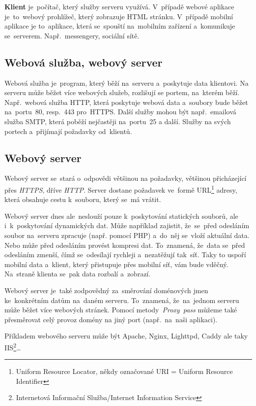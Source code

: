 \documentclass[14pt,a4paper]{article}
\begin{document}
        \textbf{Klient} je~počítač, který služby serveru využívá. V~případě webové aplikace je~to~webový prohlížeč, který zobrazuje HTML stránku.
        V~případě mobilní aplikace je to~aplikace, která se~spouští na~mobilním zařízení a~komunikuje se~serverem. Např.~messengery, sociální sítě.

        \subsection{Webová služba, webový server}
        Webová služba je~program, který běží na~serveru a~poskytuje data klientovi. Na serveru může běžet více webových služeb,
        rozlišují se portem, na~kterém běží. Např.~webová služba HTTP, která poskytuje webová data a~soubory bude běžet na~portu~80,
        resp.~443 pro~HTTPS. Další služby mohou být např.~emailová služba SMTP, která poběží nejčastěji na~portu~25 a další.
        Služby  na svých portech a~přijímají požadavky od~klientů.

        \subsection{Webový server}
        Webový server se~stará o~odpovědi většinou na požadavky, většinou přicházející přes \emph{HTTPS}, dříve \emph{HTTP}.
        Server dostane požadavek ve~formě URL\footnote{Uniform Resource Locator, někdy označované URI = Uniform Resource Identifier} adresy,
        která obsahuje cestu k~souboru, který se~má vrátit.

        Webový server dnes ale~neslouží pouze k~poskytování statických souborů, ale i~k~poskytování dynamických dat.
        Může například zajistit, že~se~před odesláním soubor na~serveru zpracuje (např. pomocí PHP) a~do~něj se~vloží aktuální data.
        Nebo může před odesláním provést kompresi dat. To~znamená, že~data se~před odesláním zmenší, čímž se~odesílají rychleji a~nezatěžují
        tak~síť. Taky to uspoří mobilní data a~klient, který přistupuje přes mobilní síť, vám bude vděčný. Na~straně klienta se~pak data rozbalí a~zobrazí.

        Webový server je~také zodpovědný za~směrování doménových jmen ke~konkrétním datům na~daném serveru. To~znamená, že~na~jednom serveru může běžet více webových stránek.
        Pomocí metody~\emph{Proxy~pass} můžeme také přesměrovat celý provoz domény na jiný port (např.~na~naši aplikaci).

        Příkladem webového serveru může být Apache, Nginx, Lighttpd, Caddy ale taky IIS\footnote{Internetová Informační Služba/Internet Information Service}\dots
\end{document}
